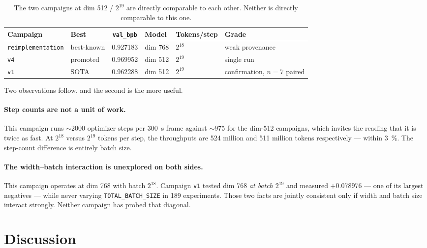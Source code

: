 \documentclass[11pt,a4paper]{article}
\newcommand{\bpb}{\texttt{val\_bpb}}
\begin{document}
\begin{table}[h]
\centering
\small
\begin{tabular}{@{}llS[table-format=1.6]lll@{}}
\toprule
\textbf{Campaign} & \textbf{Best} & {\textbf{\bpb}} & \textbf{Model} & \textbf{Tokens/step} & \textbf{Grade} \\
\midrule
\texttt{reimplementation} & best-known & 0.927183 & dim 768 & $2^{18}$ & weak provenance \\
\texttt{v4}               & promoted   & 0.969952 & dim 512 & $2^{19}$ & single run \\
\texttt{v1}               & SOTA       & 0.962288 & dim 512 & $2^{19}$ & confirmation, $n=7$ paired \\
\bottomrule
\end{tabular}
\caption{The two campaigns at dim 512 / $2^{19}$ are directly comparable to each other.
Neither is directly comparable to this one.}
\label{tab:siblings}
\end{table}

Two observations follow, and the second is the more useful.

\paragraph{Step counts are not a unit of work.} This campaign runs $\sim$2000 optimizer
steps per \SI{300}{\second} frame against $\sim$975 for the dim-512 campaigns, which invites
the reading that it is twice as fast. At $2^{18}$ versus $2^{19}$ tokens per step, the
throughputs are \num{524} million and \num{511} million tokens respectively ---
within \SI{3}{\percent}. The step-count difference is entirely batch size.

\paragraph{The width--batch interaction is unexplored on both sides.} This campaign operates
at dim 768 with batch $2^{18}$. Campaign \texttt{v1} tested dim 768 \emph{at batch $2^{19}$}
and measured $+\num{0.078976}$ --- one of its largest negatives --- while never varying
\texttt{TOTAL\_BATCH\_SIZE} in 189 experiments. Those two facts are jointly consistent only
if width and batch size interact strongly. Neither campaign has probed that diagonal.

\section{Discussion}
\end{document}
